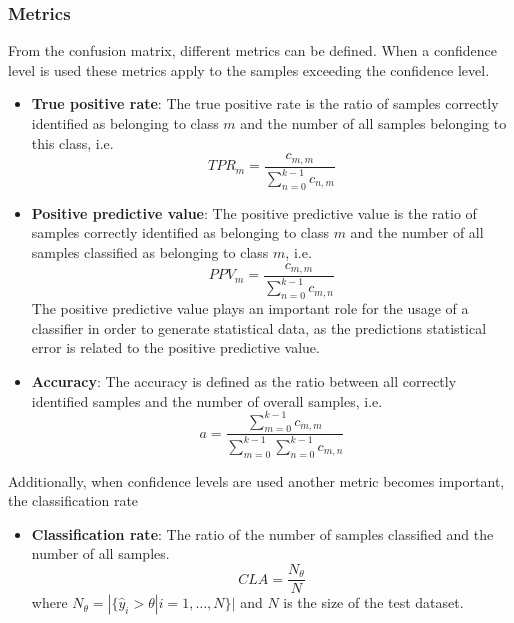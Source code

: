 \subsubsection{Metrics}

From the confusion matrix, different metrics can be defined. When a confidence level is used these metrics apply to the samples exceeding the confidence level. 
\begin{itemize}[label={}]
\item \textbf{True positive rate}: The true positive rate is the ratio of samples correctly identified as belonging to class $m$ and the number of all samples belonging to this class, i.e.
\begin{equation}
TPR_m = \frac{c_{m,m}}{\sum_{n=0}^{k-1} c_{n,m}}
\end{equation}
\item \textbf{Positive predictive value}: The positive predictive value is the ratio of samples correctly identified as belonging to class $m$ and the number of all samples classified as belonging to class $m$, i.e. 
\begin{equation}
PPV_m = \frac{c_{m,m}}{\sum_{n=0}^{k-1} c_{m,n}}
\end{equation} 
The positive predictive value plays an important role for the usage of a classifier in order to generate statistical data, as the predictions statistical error is related to the positive predictive value.
\item \textbf{Accuracy}: The accuracy is defined as the ratio between all correctly identified samples and the number of overall samples, i.e.
%
\begin{equation}
a = \frac{\sum_{m=0}^{k-1} c_{m,m}}{\sum_{m=0}^{k-1} \sum_{n=0}^{k-1} c_{m,n}}
\end{equation} 
\end{itemize}

Additionally, when confidence levels are used another metric becomes important, the classification rate
\begin{itemize}[label={}]
\item \textbf{Classification rate}: The ratio of the number of samples classified and the number of all samples.
\begin{equation}
CLA = \frac{N_\theta}{N}
\end{equation}
where $N_\theta = |\{\hat{y}_i>\theta | i = 1,\dots, N\}|$ and $N$ is the size of the test dataset.
\end{itemize}

